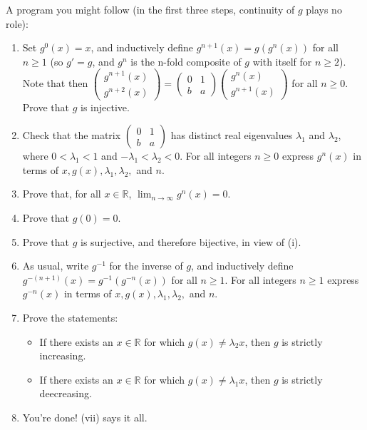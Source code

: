 \documentclass[11pt]{article}
\begin{document}
\begin{enumerate}
    A program you might follow (in the first three steps, continuity of \(g\) plays no role):
    \begin{enumerate}[label=(\roman*)]
      \item Set \(g^0(x) = x\), and inductively define \(g^{n+1}(x) = g\left(g^n(x)\right)\) for all 
        \(n \geq 1\) (so \(g' = g\), and \(g^n\) is the n-fold composite of \(g\) with itself for \(n \geq 2\)). 
        Note that then 
        \(\begin{pmatrix} g^{n+1}(x) \\ g^{n+2}(x) \end{pmatrix} = \begin{pmatrix} 0 & 1 \\ b & a \end{pmatrix}
        \begin{pmatrix} g^n(x) \\ g^{n+1}(x) \end{pmatrix}\) for all \(n \geq 0\).  Prove that \(g\) is 
        injective.
      \item Check that the matrix \(\begin{pmatrix} 0 & 1 \\ b & a \end{pmatrix}\) has distinct real 
      eigenvalues \(\lambda_1\) and \(\lambda_2\), where \(0 < \lambda_1 < 1\) and \(-\lambda_1 < \lambda_2 < 0\).
      For all integers \(n \geq 0\) express \(g^n(x)\) in terms of \(x, g(x), \lambda_1, \lambda_2,\) and \(n\).
      \item Prove that, for all \(x \in \mathbb{R}\), \(\displaystyle\lim_{n \to \infty} g^n(x) = 0\).
      \item Prove that \(g(0) = 0\).
      \item Prove that \(g\) is surjective, and therefore bijective, in view of (i).
      \item As usual, write \(g^{-1}\) for the inverse of \(g\), and inductively define \(g^{-(n+1)}(x) = 
        g^{-1}\left(g^{-n}(x)\right)\) for all \(n \geq 1\).  For all integers \(n \geq 1\) express \(g^{-n}(x)\) 
        in terms of \(x, g(x), \lambda_1, \lambda_2,\) and \(n\).
      \item Prove the statements:
        \begin{itemize}
          \item[] If there exists an \(x \in \mathbb{R}\) for which \(g(x) \neq \lambda_2 x\), then \(g\) is 
            strictly increasing.
          \item[] If there exists an \(x \in \mathbb{R}\) for which \(g(x) \neq \lambda_1 x\), then \(g\) is 
            strictly deecreasing.
        \end{itemize}
      \item You're done! (vii) says it all.
    \end{enumerate}
  \newpage



\end{enumerate}
\end{document}
